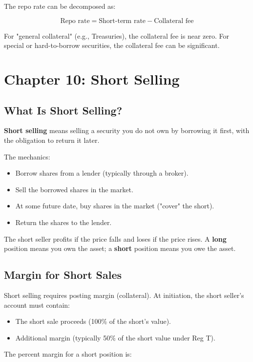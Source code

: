 \documentclass[11pt,letterpaper]{report}
\begin{document}
The repo rate can be decomposed as:

$$\text{Repo rate} = \text{Short-term rate} - \text{Collateral fee}$$

For "general collateral" (e.g., Treasuries), the collateral fee is near zero.  For special or hard-to-borrow securities, the collateral fee can be significant.


\chapter{Chapter 10: Short Selling}


\section{What Is Short Selling?}


\textbf{Short selling} means selling a security you do not own by borrowing it first, with the obligation to return it later.

The mechanics:

\begin{itemize}
  \item Borrow shares from a lender (typically through a broker).
  \item Sell the borrowed shares in the market.
  \item At some future date, buy shares in the market ("cover" the short).
  \item Return the shares to the lender.
\end{itemize}

The short seller profits if the price falls and loses if the price rises.  A \textbf{long} position means you own the asset; a \textbf{short} position means you owe the asset.

\section{Margin for Short Sales}


Short selling requires posting margin (collateral).  At initiation, the short seller's account must contain:

\begin{itemize}
  \item The short sale proceeds (100\% of the short's value).
  \item Additional margin (typically 50\% of the short value under Reg T).
\end{itemize}

The percent margin for a short position is:
\end{document}
